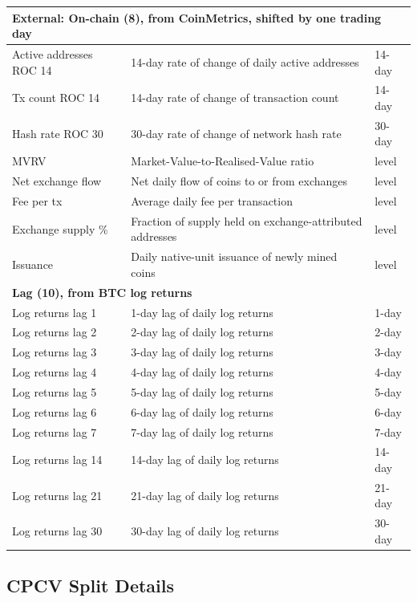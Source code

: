 \documentclass[12pt,a4paper,oneside]{article}
\begin{document}
\begin{longtable}{p{3.5cm}p{7cm}p{2.5cm}}
\midrule
\multicolumn{3}{l}{\textbf{External: On-chain (8), from CoinMetrics, shifted by one trading day}} \\
\midrule
Active addresses ROC 14 & 14-day rate of change of daily active addresses & 14-day \\
Tx count ROC 14 & 14-day rate of change of transaction count & 14-day \\
Hash rate ROC 30 & 30-day rate of change of network hash rate & 30-day \\
MVRV & Market-Value-to-Realised-Value ratio & level \\
Net exchange flow & Net daily flow of coins to or from exchanges & level \\
Fee per tx & Average daily fee per transaction & level \\
Exchange supply \% & Fraction of supply held on exchange-attributed addresses & level \\
Issuance & Daily native-unit issuance of newly mined coins & level \\

\midrule
\multicolumn{3}{l}{\textbf{Lag (10), from BTC log returns}} \\
\midrule
Log returns lag 1 & 1-day lag of daily log returns & 1-day \\
Log returns lag 2 & 2-day lag of daily log returns & 2-day \\
Log returns lag 3 & 3-day lag of daily log returns & 3-day \\
Log returns lag 4 & 4-day lag of daily log returns & 4-day \\
Log returns lag 5 & 5-day lag of daily log returns & 5-day \\
Log returns lag 6 & 6-day lag of daily log returns & 6-day \\
Log returns lag 7 & 7-day lag of daily log returns & 7-day \\
Log returns lag 14 & 14-day lag of daily log returns & 14-day \\
Log returns lag 21 & 21-day lag of daily log returns & 21-day \\
Log returns lag 30 & 30-day lag of daily log returns & 30-day \\

\end{longtable}

\subsection{CPCV Split Details}\label{app:cpcv_splits}
\end{document}
